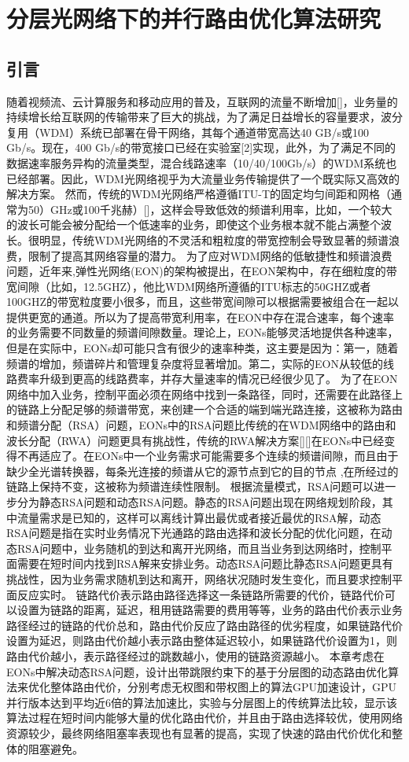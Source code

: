 
\chapter{分层光网络下的并行路由优化算法研究}
\section{引言}
  随着视频流、云计算服务和移动应用的普及，互联网的流量不断增加[]，业务量的持续增长给互联网的传输带来了巨大的挑战，为了满足日益增长的容量要求，波分复用（WDM）系统已部署在骨干网络，其每个通道带宽高达40 GB/s或100 Gb/s。现在，400 Gb/s的带宽接口已经在实验室[2]实现，此外，为了满足不同的数据速率服务异构的流量类型，混合线路速率（10/40/100Gb/s）的WDM系统也已经部署。因此，WDM光网络视乎为大流量业务传输提供了一个既实际又高效的解决方案。
  然而，传统的WDM光网络严格遵循ITU-T的固定均匀间距和网格（通常为50）GHz或100千兆赫）[]，这样会导致低效的频谱利用率，比如，一个较大的波长可能会被分配给一个低速率的业务，即使这个业务根本就不能占满整个波长。很明显，传统WDM光网络的不灵活和粗粒度的带宽控制会导致显著的频谱浪费，限制了提高其网络容量的潜力。
  为了应对WDM网络的低敏捷性和频谱浪费问题，近年来,弹性光网络(EON)的架构被提出，在EON架构中，存在细粒度的带宽间隙（比如，12.5GHZ），他比WDM网络所遵循的ITU标志的50GHZ或者100GHZ的带宽粒度要小很多，而且，这些带宽间隙可以根据需要被组合在一起以提供更宽的通道。所以为了提高带宽利用率，在EON中存在混合速率，每个速率的业务需要不同数量的频谱间隙数量。理论上，EONs能够灵活地提供各种速率，但是在实际中，EONs却可能只含有很少的速率种类，这主要是因为：第一，随着频谱的增加，频谱碎片和管理复杂度将显著增加。第二，实际的EON从较低的线路费率升级到更高的线路费率，并存大量速率的情况已经很少见了。
  为了在EON网络中加入业务，控制平面必须在网络中找到一条路径，同时，还需要在此路径上的链路上分配足够的频谱带宽，来创建一个合适的端到端光路连接，这被称为路由和频谱分配（RSA）问题，EONs中的RSA问题比传统的在WDM网络中的路由和波长分配（RWA）问题更具有挑战性，传统的RWA解决方案[][]在EONs中已经变得不再适应了。在EONs中一个业务需求可能需要多个连续的频谱间隙，而且由于缺少全光谱转换器，每条光连接的频谱从它的源节点到它的目的节点 ,在所经过的链路上保持不变，这被称为频谱连续性限制。
  根据流量模式，RSA问题可以进一步分为静态RSA问题和动态RSA问题。静态的RSA问题出现在网络规划阶段，其中流量需求是已知的，这样可以离线计算出最优或者接近最优的RSA解，动态RSA问题是指在实时业务情况下光通路的路由选择和波长分配的优化问题，在动态RSA问题中，业务随机的到达和离开光网络，而且当业务到达网络时，控制平面需要在短时间内找到RSA解来安排业务。动态RSA问题比静态RSA问题更具有挑战性，因为业务需求随机到达和离开，网络状况随时发生变化，而且要求控制平面反应实时。
 链路代价表示路由路径选择这一条链路所需要的代价，链路代价可以设置为链路的距离，延迟，租用链路需要的费用等等，业务的路由代价表示业务路径经过的链路的代价总和，路由代价反应了路由路径的优劣程度，如果链路代价设置为延迟，则路由代价越小表示路由整体延迟较小，如果链路代价设置为1，则路由代价越小，表示路径经过的跳数越小，使用的链路资源越小。
 本章考虑在EONs中解决动态RSA问题，设计出带跳限约束下的基于分层图的动态路由优化算法来优化整体路由代价，分别考虑无权图和带权图上的算法GPU加速设计，GPU并行版本达到平均近6倍的算法加速比，实验与分层图上的传统算法比较，显示该算法过程在短时间内能够大量的优化路由代价，并且由于路由选择较优，使用网络资源较少，最终网络阻塞率表现也有显著的提高，实现了快速的路由代价优化和整体的阻塞避免。
